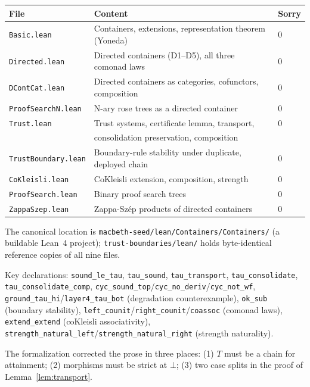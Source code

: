 \documentclass[11pt,a4paper]{article}
\theoremstyle{plain}
\theoremstyle{definition}
\begin{document}
\begin{center}
\begin{tabular}{lll}
\toprule
File & Content & Sorry \\
\midrule
\texttt{Basic.lean} & Containers, extensions, representation theorem (Yoneda) & 0 \\
\texttt{Directed.lean} & Directed containers (D1--D5), all three comonad laws & 0 \\
\texttt{DContCat.lean} & Directed containers as categories, cofunctors, composition & 0 \\
\texttt{ProofSearchN.lean} & N-ary rose trees as a directed container & 0 \\
\texttt{Trust.lean} & Trust systems, certificate lemma, transport, & 0 \\
& consolidation preservation, composition & \\
\texttt{TrustBoundary.lean} & Boundary-rule stability under duplicate, deployed chain & 0 \\
\texttt{CoKleisli.lean} & CoKleisli extension, composition, strength & 0 \\
\texttt{ProofSearch.lean} & Binary proof search trees & 0 \\
\texttt{ZappaSzep.lean} & Zappa-Sz\'{e}p products of directed containers & 0 \\
\bottomrule
\end{tabular}
\end{center}

The canonical location is \texttt{macbeth-seed/lean/Containers/Containers/}
(a buildable Lean~4 project); \texttt{trust-boundaries/lean/} holds
byte-identical reference copies of all nine files.

Key declarations: \texttt{sound\_le\_tau}, \texttt{tau\_sound},
\texttt{tau\_transport}, \texttt{tau\_consolidate},
\texttt{tau\_consolidate\_comp}, \texttt{cyc\_sound\_top}/\texttt{cyc\_no\_deriv}/\texttt{cyc\_not\_wf},
\texttt{ground\_tau\_hi}/\texttt{layer4\_tau\_bot} (degradation
counterexample), \texttt{ok\_sub} (boundary stability),
\texttt{left\_counit}/\texttt{right\_counit}/\texttt{coassoc} (comonad laws),
\texttt{extend\_extend} (coKleisli associativity),
\texttt{strength\_natural\_left}/\texttt{strength\_natural\_right} (strength naturality).

The formalization corrected the prose in three places: (1) $T$ must be a
chain for attainment; (2) morphisms must be strict at $\bot$; (3) two
case splits in the proof of Lemma~\ref{lem:transport}.
\end{document}
